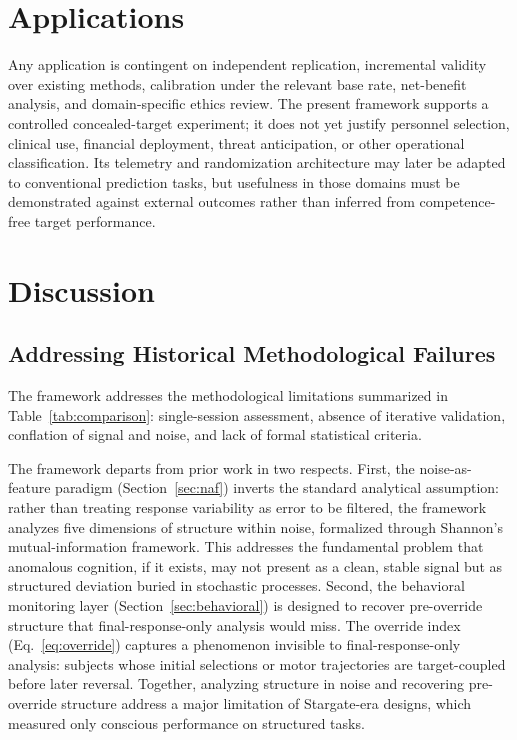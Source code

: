 \documentclass[11pt,letterpaper]{article}
\begin{document}
\section{Applications}
Any application is contingent on independent replication, incremental validity over existing methods, calibration under the relevant base rate, net-benefit analysis, and domain-specific ethics review. The present framework supports a controlled concealed-target experiment; it does not yet justify personnel selection, clinical use, financial deployment, threat anticipation, or other operational classification. Its telemetry and randomization architecture may later be adapted to conventional prediction tasks, but usefulness in those domains must be demonstrated against external outcomes rather than inferred from competence-free target performance.

\section{Discussion}

\subsection{Addressing Historical Methodological Failures}

The framework addresses the methodological limitations summarized in Table~\ref{tab:comparison}: single-session assessment, absence of iterative validation, conflation of signal and noise, and lack of formal statistical criteria.

The framework departs from prior work in two respects. First, the noise-as-feature paradigm (Section~\ref{sec:naf}) inverts the standard analytical assumption: rather than treating response variability as error to be filtered, the framework analyzes five dimensions of structure within noise, formalized through Shannon's mutual-information framework. This addresses the fundamental problem that anomalous cognition, if it exists, may not present as a clean, stable signal but as structured deviation buried in stochastic processes. Second, the behavioral monitoring layer (Section~\ref{sec:behavioral}) is designed to recover pre-override structure that final-response-only analysis would miss. The override index (Eq.~\ref{eq:override}) captures a phenomenon invisible to final-response-only analysis: subjects whose initial selections or motor trajectories are target-coupled before later reversal. Together, analyzing structure in noise and recovering pre-override structure address a major limitation of Stargate-era designs, which measured only conscious performance on structured tasks.
\end{document}
